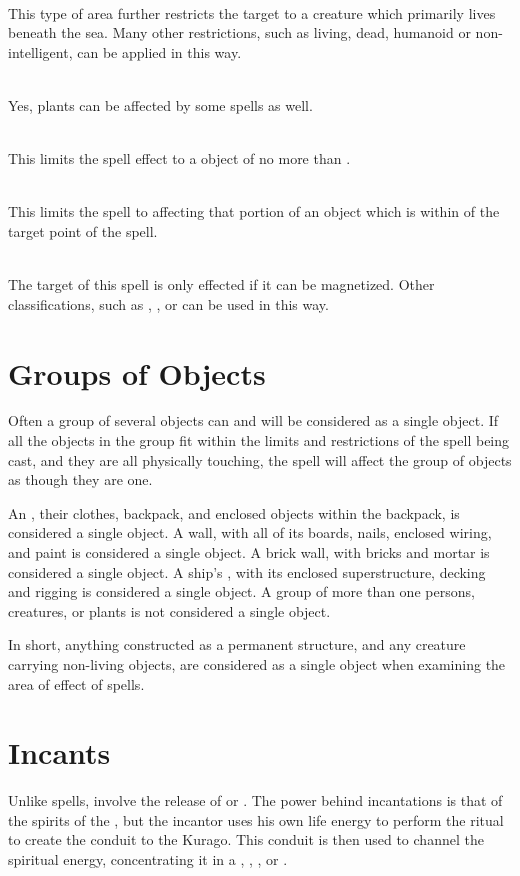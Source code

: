 \begin{multicols*}{2}
\\
This type of area further restricts the target to a creature which primarily lives beneath the sea. Many other restrictions, such as living, dead, humanoid or non-intelligent, can be applied in this way.

\\
Yes, plants can be affected by some spells as well.

\\
This limits the spell effect to a  object of no more than .

\\
This limits the spell to affecting that portion of an object which is within  of the target point of the spell.

\\
The target of this spell is only effected if it can be magnetized. Other classifications, such as , ,  or  can be used in this way.
\section{Groups of Objects}
Often a group of several objects can and will be considered as a single object. If all the objects in the group fit within the limits and restrictions of the spell being cast, and they are all physically touching, the spell will affect the group of objects as though they are one. 

An , their clothes, backpack, and enclosed objects within the backpack, is considered a single object. A wall, with all of its boards, nails, enclosed wiring, and paint is considered a single object. A brick wall, with bricks and mortar is considered a single object. A ship's , with its enclosed superstructure, decking and rigging is considered a single object. A group of more than one persons, creatures, or plants is not considered a single object.

In short, anything constructed as a permanent structure, and any creature carrying non-living objects, are considered as a single object when examining the area of effect of spells.
\section{Incants}
Unlike spells,  involve the release of  or . The power behind incantations is that of the spirits of the , but the incantor uses his own life energy to perform the ritual to create the conduit to the Kurago. This conduit is then used to channel the spiritual energy, concentrating it in a , , ,  or . 


\end{multicols*}
